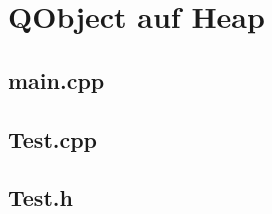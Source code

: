 \begin{minipage}[t]{0.5\textwidth}

\end{minipage}\hfill
\begin{minipage}[t]{0.48\textwidth}

\end{minipage}


\section{QObject auf Heap}
\begin{minipage}[t]{0.32\textwidth}
\subsection{main.cpp}


\end{minipage}
\begin{minipage}[t]{0.32\textwidth}
\subsection{Test.cpp}


\end{minipage}
\begin{minipage}[t]{0.32\textwidth}
\subsection{Test.h}


\end{minipage}

